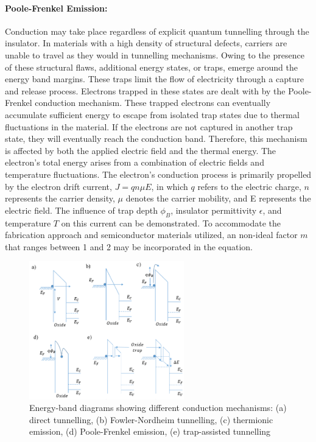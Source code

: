 \paragraph{Poole-Frenkel Emission:} Conduction may take place regardless of explicit quantum tunnelling through the insulator. In materials with a high density of structural defects, carriers are unable to travel as they would in tunnelling mechanisms. Owing to the presence of these structural flaws, additional energy states, or traps, emerge around the energy band margins. These traps limit the flow of electricity through a capture and release process. Electrons trapped in these states are dealt with by the Poole-Frenkel conduction mechanism. These trapped electrons can eventually accumulate sufficient energy to escape from isolated trap states due to thermal fluctuations in the material. If the electrons are not captured in another trap state, they will eventually reach the conduction band. Therefore, this mechanism is affected by both the applied electric field and the thermal energy. The electron's total energy arises from a combination of electric fields and temperature fluctuations. The electron's conduction process is primarily propelled by the electron drift current, $J = qn\mu E$, in which $q$ refers to the electric charge, $n$ represents the carrier density, $\mu$ denotes the carrier mobility, and E represents the electric field. The influence of trap depth $\phi_B$, insulator permittivity $\epsilon$, and temperature $T$ on this current can be demonstrated. To accommodate the fabrication approach and semiconductor materials utilized, an non-ideal factor $m$ that ranges between 1 and 2 may be incorporated in the equation.

\begin{figure}[htbp!] 
\centering    
\includegraphics[width=0.6\textwidth]{Chapter1/Figs/1d.png}
\caption[Energy-band diagrams showing different conduction mechanisms.]{Energy-band diagrams showing different conduction mechanisms: (a) direct tunnelling, (b) Fowler-Nordheim tunnelling, (c) thermionic emission, (d) Poole-Frenkel emission, (e) trap-assisted tunnelling \cite{sze2021physics}}
\label{fig:1d}
\end{figure}


